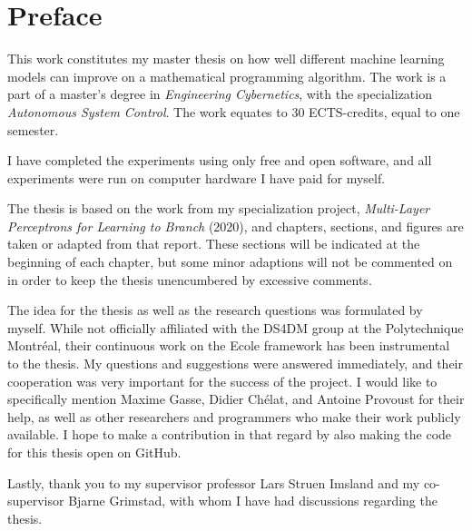 \chapter*{Preface}
%
This work constitutes my master thesis on how well different machine learning models can improve on a mathematical programming algorithm. The work is a part of a master's degree in \textit{Engineering Cybernetics}, with the specialization\textit{ Autonomous System Control}.
The work equates to 30 ECTS-credits, equal to one semester. 

I have completed the experiments using only free and open software, and all experiments were run on computer hardware I have paid for myself.  

The thesis is based on the work from my specialization project, \textit{Multi-Layer Perceptrons for Learning to Branch
} (2020), and chapters, sections, and figures are taken or adapted from that report. These sections will be indicated at the beginning of each chapter, but some minor adaptions will not be commented on in order to keep the thesis unencumbered by excessive comments.

The idea for the thesis as well as the research questions was formulated by myself.
While not officially affiliated with the \gls{DS4DM} group at the Polytechnique Montr\'{e}al, their continuous work on the \gls{Ecole} framework has been instrumental to the thesis. My questions and suggestions were answered immediately, and their cooperation was very important for the success of the project. I would like to specifically mention Maxime Gasse, Didier Ch\'{e}lat, and Antoine Provoust for their help, as well as other researchers and programmers who make their work publicly available. I hope to make a contribution in that regard by also making the code for this thesis open on GitHub.

Lastly, thank you to my supervisor professor Lars Struen Imsland and my co-supervisor Bjarne Grimstad, with whom I have had discussions regarding the thesis. 


%
\clearpage
